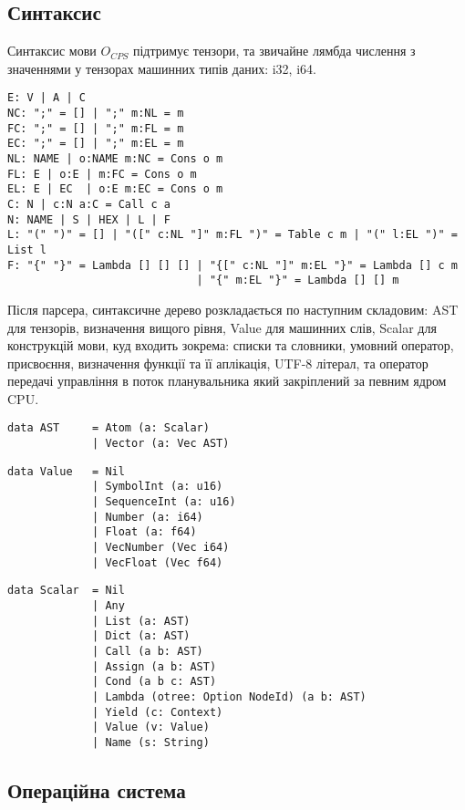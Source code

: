 \begin{definition}
\begin{definition}
\begin{definition}
\begin{definition}
\newpage
\subsection{Синтаксис}

Синтаксис мови $O_{CPS}$ підтримує тензори, та звичайне лямбда числення
з значеннями у тензорах машинних типів даних: i32, i64.

\begin{lstlisting}[mathescape=true]
E: V | A | C
NC: ";" = [] | ";" m:NL = m
FC: ";" = [] | ";" m:FL = m
EC: ";" = [] | ";" m:EL = m
NL: NAME | o:NAME m:NC = Cons o m
FL: E | o:E | m:FC = Cons o m
EL: E | EC  | o:E m:EC = Cons o m
C: N | c:N a:C = Call c a
N: NAME | S | HEX | L | F
L: "(" ")" = [] | "([" c:NL "]" m:FL ")" = Table c m | "(" l:EL ")" = List l
F: "{" "}" = Lambda [] [] [] | "{[" c:NL "]" m:EL "}" = Lambda [] c m
                             | "{" m:EL "}" = Lambda [] [] m
\end{lstlisting}

Після парсера, синтаксичне дерево розкладається по наступним складовим: AST для
тензорів, визначення вищого рівня, Value для машинних слів, Scalar для
конструкцій мови, куд входить зокрема: списки та словники, умовний оператор,
присвоєння, визначення функції та її аплікація, UTF-8 літерал, та оператор
передачі управління в поток планувальника який закріплений за певним ядром CPU.

\begin{lstlisting}
data AST     = Atom (a: Scalar)
             | Vector (a: Vec AST)
\end{lstlisting}

\begin{lstlisting}
data Value   = Nil
             | SymbolInt (a: u16)
             | SequenceInt (a: u16)
             | Number (a: i64)
             | Float (a: f64)
             | VecNumber (Vec i64)
             | VecFloat (Vec f64)
\end{lstlisting}

\begin{lstlisting}
data Scalar  = Nil
             | Any
             | List (a: AST)
             | Dict (a: AST)
             | Call (a b: AST)
             | Assign (a b: AST)
             | Cond (a b c: AST)
             | Lambda (otree: Option NodeId) (a b: AST)
             | Yield (c: Context)
             | Value (v: Value)
             | Name (s: String)
\end{lstlisting}

\newpage
\subsection{Операційна система}


\end{definition}
\end{definition}
\end{definition}
\end{definition}
